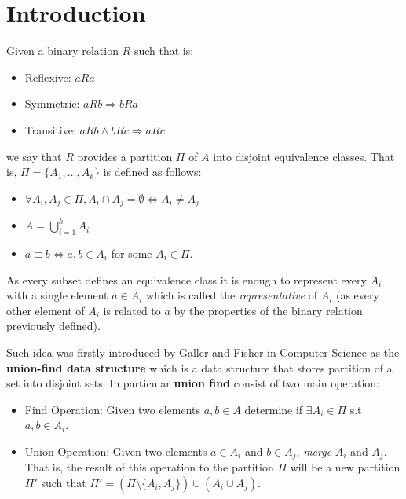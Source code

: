 \section{Introduction}

Given a binary relation $R$ such that is:
\begin{itemize}
    \item Reflexive: $a R a$
    \item Symmetric: $a R b \Rightarrow b R a$
    \item Transitive: $a R b \land b R c \Rightarrow a R c$
\end{itemize}

we say that $R$ provides a partition $\Pi$ of $A$ into disjoint equivalence classes. That is, $\Pi = \{A_1, \ldots, A_k\}$ is defined as follows:

\begin{itemize}
    \item $\forall A_i, A_j \in \Pi, A_i \cap A_j = \emptyset \iff A_i \neq A_j$
    \item $A = \bigcup\limits_{i = 1}^{k} A_i$
    \item $a \equiv b \iff a,b \in A_i$ for some $A_i \in \Pi$.
\end{itemize}

As every subset defines an equivalence class it is enough to represent every $A_i$ with a single element $a \in A_i$ which is called the \textit{representative} of $A_i$ (as every other element of $A_i$ is related to $a$ by the properties of the binary relation previously defined).

Such idea was firstly introduced by Galler and Fisher\cite{galler1964improved} in Computer Science as the \textbf{union-find data structure} which is a data structure that stores partition of a set into disjoint sets. In particular \textbf{union find} consist of two main operation:

\begin{itemize}
    \item Find Operation: Given two elements $a,b \in A$ determine if $\exists A_i \in \Pi$ s.t $a,b \in A_i$.
    \item Union Operation: Given two elements $a \in A_i$ and $b \in A_j$, \textit{merge} $A_i$ and $A_j$. That is, the result of this operation to the partition $\Pi$ will be a new partition $\Pi'$ such that $\Pi' = (\Pi \setminus \{A_i, A_j\}) \cup (A_i \cup A_j)$.
\end{itemize}
